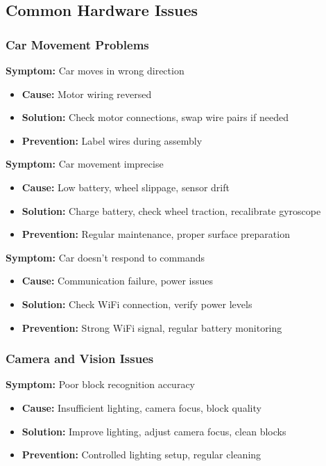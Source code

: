 \subsection{Common Hardware Issues}

\subsubsection{Car Movement Problems}

\textbf{Symptom:} Car moves in wrong direction
\begin{itemize}
    \item \textbf{Cause:} Motor wiring reversed
    \item \textbf{Solution:} Check motor connections, swap wire pairs if needed
    \item \textbf{Prevention:} Label wires during assembly
\end{itemize}

\textbf{Symptom:} Car movement imprecise
\begin{itemize}
    \item \textbf{Cause:} Low battery, wheel slippage, sensor drift
    \item \textbf{Solution:} Charge battery, check wheel traction, recalibrate gyroscope
    \item \textbf{Prevention:} Regular maintenance, proper surface preparation
\end{itemize}

\textbf{Symptom:} Car doesn't respond to commands
\begin{itemize}
    \item \textbf{Cause:} Communication failure, power issues
    \item \textbf{Solution:} Check WiFi connection, verify power levels
    \item \textbf{Prevention:} Strong WiFi signal, regular battery monitoring
\end{itemize}

\subsubsection{Camera and Vision Issues}

\textbf{Symptom:} Poor block recognition accuracy
\begin{itemize}
    \item \textbf{Cause:} Insufficient lighting, camera focus, block quality
    \item \textbf{Solution:} Improve lighting, adjust camera focus, clean blocks
    \item \textbf{Prevention:} Controlled lighting setup, regular cleaning
\end{itemize}

